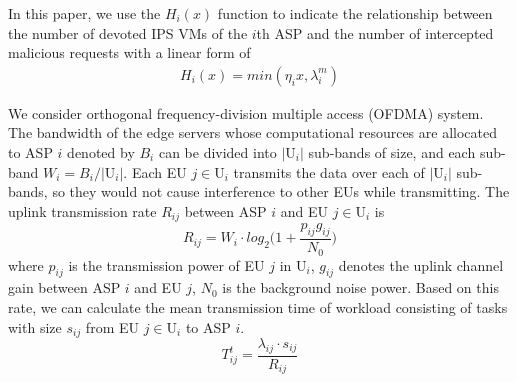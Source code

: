 \documentclass[10pt,journal, compsoc]{IEEEtran}
\begin{document}
In this paper, we use the $H_i(x)$ function to indicate the relationship between the number of devoted IPS VMs of the $i$th ASP  and the number of intercepted malicious requests with a linear form of
\begin{equation}
\begin{aligned}
    H_i(x) = min(\eta_i{x}, \lambda_i^m)
\end{aligned}
\end{equation}

We consider orthogonal frequency-division multiple access (OFDMA) system. The bandwidth of the edge servers whose computational resources are allocated to ASP $i$ denoted by $B_i$ can be divided into $|\mathrm{U}_i|$ sub-bands of size, and each sub-band $W_{i} = B_i/|\mathrm{U}_i|$. Each EU $j\in \mathrm{U}_i$ transmits the data over each of $|\mathrm{U}_i|$ sub-bands, so they would not cause interference to other EUs while transmitting. The uplink transmission rate $R_{ij}$ between ASP $i$ and EU $j \in \mathrm{U}_i$ is
\begin{equation} \label{eqn:shannon}
R_{ij}=W_i \cdot log_2\Big(1+\frac{p_{ij}g_{ij}}{N_{0}}\Big)
\end{equation}
where $p_{ij}$ is the transmission power of EU $j$ in $\mathrm{U}_i$, $g_{ij}$ denotes the uplink channel gain between ASP $i$ and EU $j$, $N_0$ is the background noise power. Based on this rate, we can calculate the mean transmission time of workload consisting of tasks with size $s_{ij}$ from EU $j \in \mathrm{U}_i$ to ASP $i$.
\begin{equation}
T_{ij}^t=\frac{\lambda_{ij} \cdot s_{ij}}{R_{ij}}
\end{equation}
\end{document}
